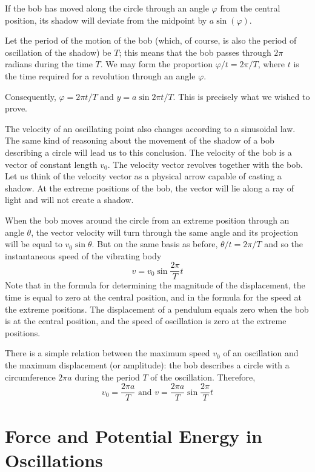 If the bob has moved along the circle through an angle $\varphi$ from the central position, its shadow will deviate from
the midpoint by $a \sin (\varphi)$.

Let the period of the motion of the bob (which, of
course, is also the period of oscillation of the shadow)
be $T$; this means that the bob passes through $2\pi$ radians
during the time $T$. We may form the proportion $\varphi/t = 2\pi/T$, where $t$ is the time required for a revolution
through an angle $\varphi$.

Consequently, $\varphi = 2\pi t /T$ and $y = a \sin 2 \pi t/T$. This is
precisely what we wished to prove.

The velocity of an oscillating point also changes
according to a sinusoidal law. The same kind of reasoning about the movement of the shadow of a bob describing
a circle will lead us to this conclusion. The velocity of
the bob is a vector of constant length $v_{0}$. The velocity
vector revolves together with the bob. Let us think of
the velocity vector as a physical arrow capable of casting
a shadow. At the extreme positions of the bob, the vector
will lie along a ray of light and will not create a shadow.

When the bob moves around the circle from an extreme
position through an angle $\theta$, the vector velocity will
turn through the same angle and its projection will be
equal to $v_{0} \sin \theta$. But on the same basis as before, $\theta /t = 2\pi/T$ and so the instantaneous speed of the vibrating body
\begin{equation*}%
v = v_{0} \sin \frac{2\pi}{T} t
\end{equation*}
Note that in the formula for determining the magnitude
of the displacement, the time is equal to zero at the
central position, and in the formula for the speed at the
extreme positions. The displacement of a pendulum equals
zero when the bob is at the central position, and the
speed of oscillation is zero at the extreme positions.

There is a simple relation between the maximum speed $v_{0}$ of an oscillation and the maximum displacement (or amplitude): the bob describes a circle with a circumference $2 \pi a$ during the period $T$ of the oscillation. Therefore,
\begin{equation*}%
v_{0} = \frac{2\pi a}{T} \,\,\textrm{and}\,\,v=\frac{2 \pi a}{T} \sin \frac{2 \pi}{T} t
\end{equation*}

\section{Force and Potential Energy in Oscillations}

